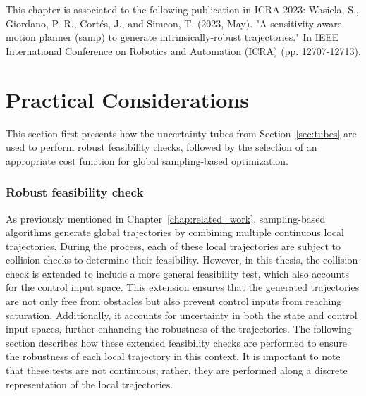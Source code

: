 This chapter is associated to the following publication in ICRA 2023: Wasiela, S., Giordano, P. R., Cortés, J., and Simeon, T. (2023, May). "A sensitivity-aware motion planner (samp) to generate intrinsically-robust trajectories." In IEEE International Conference on Robotics and Automation (ICRA) (pp. 12707-12713).

\section{Practical Considerations}\label{sec:metrics}

This section first presents how the uncertainty tubes from Section~\ref{sec:tubes} are used to perform robust feasibility checks, followed by the selection of an appropriate cost function for global sampling-based optimization.

\subsubsection{Robust feasibility check}\label{sec:robust_CC}

As previously mentioned in Chapter~\ref{chap:related_work}, sampling-based algorithms generate global trajectories by combining multiple continuous local trajectories.
During the process, each of these local trajectories are subject to collision checks to determine their feasibility.
However, in this thesis, the collision check is extended to include a more general feasibility test, which also accounts for the control input space. 
This extension ensures that the generated trajectories are not only free from obstacles but also prevent control inputs from reaching saturation. 
Additionally, it accounts for uncertainty in both the state and control input spaces, further enhancing the robustness of the trajectories.
The following section describes how these extended feasibility checks are performed to ensure the robustness of each local trajectory in this context.
It is important to note that these tests are not continuous; rather, they are performed along a discrete representation of the local trajectories.

